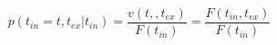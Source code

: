 \begin{equation}
p(t_{in}=t,t_{ex}|t_{in})  = \frac{v(t,,t_{ex})}{F(t_{in})}= \frac{F(t_{in},t_{ex})}{F(t_{in})}
\end{equation}